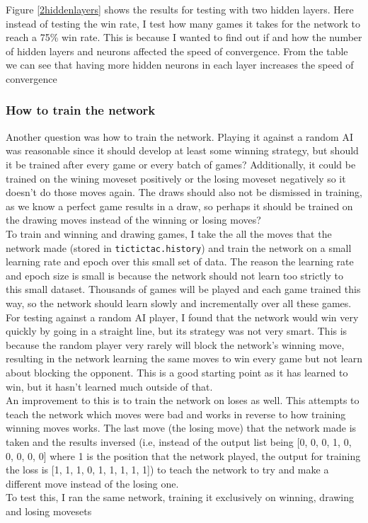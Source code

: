 \documentclass{article}
\newcommand{\n}[0]{\\[\baselineskip]}
\begin{document}
Figure \ref{2hiddenlayers} shows the results for testing with two hidden layers. Here instead of testing the win rate, I test how many games it takes for the network to reach a 75\% win rate. This is because I wanted to find out if and how the number of hidden layers and neurons affected the speed of convergence. From the table we can see that having more hidden neurons in each layer increases the speed of convergence 



\subsubsection{How to train the network}
Another question was how to train the network. Playing it against a random AI was reasonable since it should develop at least some winning strategy, but should it be trained after every game or every batch of games? Additionally, it could be trained on the wining moveset positively or the losing moveset negatively so it doesn't do those moves again. The draws should also not be dismissed in training, as we know a perfect game results in a draw, so perhaps it should be trained on the drawing moves instead of the winning or losing moves?
\n
To train and winning and drawing games, I take the all the moves that the network made (stored in \texttt{tictictac.history}) and train the network on a small learning rate and epoch over this small set of data. The reason the learning rate and epoch size is small is because the network should not learn too strictly to this small dataset. Thousands of games will be played and each game trained this way, so the network should learn slowly and incrementally over all these games. For testing against a random AI player, I found that the network would win very quickly by going in a straight line, but its strategy was not very smart. This is because the random player very rarely will block the network's winning move, resulting in the network learning the same moves to win every game but not learn about blocking the opponent. This is a good starting point as it has learned to win, but it hasn't learned much outside of that.
\n
An improvement to this is to train the network on loses as well. This attempts to teach the network which moves were bad and works in reverse to how training winning moves works. The last move (the losing move) that the network made is taken and the results inversed (i.e, instead of the output list being [0, 0, 0, 1, 0, 0, 0, 0, 0] where 1 is the position that the network played, the output for training the loss is [1, 1, 1, 0, 1, 1, 1, 1, 1]) to teach the network to try and make a different move instead of the losing one. 
\n
To test this, I ran the same network, training it exclusively on winning, drawing and losing movesets  
\end{document}
